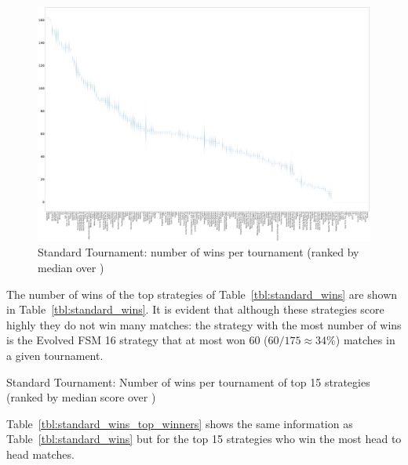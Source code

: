 \documentclass{article}
\begin{document}
\begin{landscape}
    \begin{figure}[!hbtp]
        \centering
        \includegraphics[width=\paperwidth]{./assets/standard_wins_boxplots.pdf}
        \caption{Standard Tournament: number of wins per tournament (ranked by
        median over
        \protecttournaments)}
        \label{fig:standard_winplot}
    \end{figure}
\end{landscape}

The number of wins of the top strategies of Table~\ref{tbl:standard_wins} are
shown in Table~\ref{tbl:standard_wins}. It is evident that although these
strategies score highly they do not win many matches: the strategy with the most
number of wins is the Evolved FSM 16 strategy that at most won 60
(\(60/175\approx34\%\)) matches in a given tournament.

\begin{table}[!hbtp]
    \centering
        
        \caption{Standard Tournament: Number of wins per tournament
        of top 15 strategies (ranked by median score over
        \protecttournaments)}
        \label{tbl:standard_wins}
\end{table}

Table~\ref{tbl:standard_wins_top_winners} shows the same information as
Table~\ref{tbl:standard_wins} but for the top 15 strategies who win the most
head to head matches.
\end{document}
